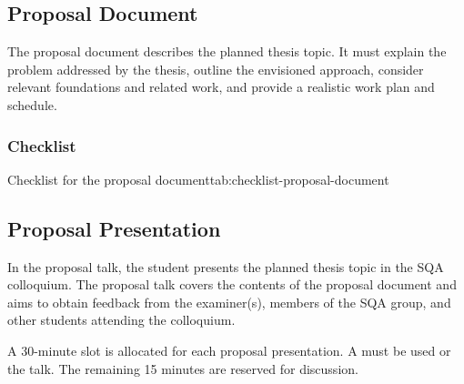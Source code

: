 \documentclass[11pt,a4paper]{article}
\begin{document}
\subsection{Proposal Document}
The proposal document describes the planned thesis topic.
It must explain the problem addressed by the thesis, outline the envisioned approach, consider relevant foundations and related work, and provide a realistic work plan and schedule.

\subsubsection*{Checklist}
\begin{checklisttable}{Checklist for the proposal document}{tab:checklist-proposal-document}


\checksep
{}
\end{checklisttable}

\subsection{Proposal Presentation}
In the proposal talk, the student presents the planned thesis topic in the SQA colloquium.
The proposal talk covers the contents of the proposal document and aims to obtain feedback from the examiner(s), members of the SQA group, and other students attending the colloquium.

A 30-minute slot is allocated for each proposal presentation. A  must be used or the talk. The remaining 15 minutes are reserved for discussion. 
\end{document}

